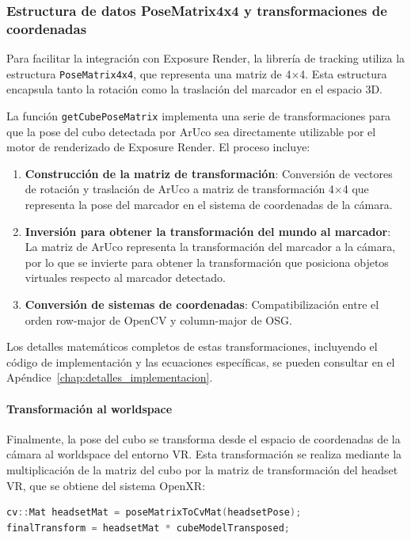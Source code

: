 \subsubsection{Estructura de datos PoseMatrix4x4 y transformaciones de coordenadas}

Para facilitar la integración con Exposure Render, la librería de tracking utiliza la estructura \texttt{PoseMatrix4x4}, que representa una matriz de 4×4. Esta estructura encapsula tanto la rotación como la traslación del marcador en el espacio 3D.

La función \texttt{getCubePoseMatrix} implementa una serie de transformaciones para que la pose del cubo detectada por ArUco sea directamente utilizable por el motor de renderizado de Exposure Render. El proceso incluye:

\begin{enumerate}
    \item \textbf{Construcción de la matriz de transformación}: Conversión de vectores de rotación y traslación de ArUco a matriz de transformación 4×4 que representa la pose del marcador en el sistema de coordenadas de la cámara.
    \item \textbf{Inversión para obtener la transformación del mundo al marcador}: La matriz de ArUco representa la transformación del marcador a la cámara, por lo que se invierte para obtener la transformación que posiciona objetos virtuales respecto al marcador detectado.
    \item \textbf{Conversión de sistemas de coordenadas}: Compatibilización entre el orden row-major de OpenCV y column-major de OSG.
\end{enumerate}

Los detalles matemáticos completos de estas transformaciones, incluyendo el código de implementación y las ecuaciones específicas, se pueden consultar en el Apéndice~\ref{chap:detalles_implementacion}.




\paragraph{Transformación al \gls{worldspace}}
Finalmente, la pose del cubo se transforma desde el espacio de coordenadas de la cámara al \gls{worldspace} del entorno VR. Esta transformación se realiza mediante la multiplicación de la matriz del cubo por la matriz de transformación del headset VR, que se obtiene del sistema OpenXR:

\begin{lstlisting}[language=C++]
cv::Mat headsetMat = poseMatrixToCvMat(headsetPose);
finalTransform = headsetMat * cubeModelTransposed;
\end{lstlisting}


